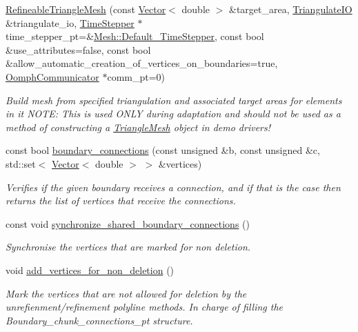 \begin{DoxyCompactItemize}
\item 
\hyperlink{classoomph_1_1RefineableTriangleMesh_a488004263be96473c332468e13e80a83}{Refineable\+Triangle\+Mesh} (const \hyperlink{classoomph_1_1Vector}{Vector}$<$ double $>$ \&target\+\_\+area, \hyperlink{structoomph_1_1TriangulateIO}{Triangulate\+IO} \&triangulate\+\_\+io, \hyperlink{classoomph_1_1TimeStepper}{Time\+Stepper} $\ast$time\+\_\+stepper\+\_\+pt=\&\hyperlink{classoomph_1_1Mesh_a12243d0fee2b1fcee729ee5a4777ea10}{Mesh\+::\+Default\+\_\+\+Time\+Stepper}, const bool \&use\+\_\+attributes=false, const bool \&allow\+\_\+automatic\+\_\+creation\+\_\+of\+\_\+vertices\+\_\+on\+\_\+boundaries=true, \hyperlink{classoomph_1_1OomphCommunicator}{Oomph\+Communicator} $\ast$comm\+\_\+pt=0)
\begin{DoxyCompactList}\small\item\em Build mesh from specified triangulation and associated target areas for elements in it N\+O\+TE\+: This is used O\+N\+LY during adaptation and should not be used as a method of constructing a \hyperlink{classoomph_1_1TriangleMesh}{Triangle\+Mesh} object in demo drivers! \end{DoxyCompactList}\item 
const bool \hyperlink{classoomph_1_1RefineableTriangleMesh_a44ebcc99018e3d6795eca66ea20628b0}{boundary\+\_\+connections} (const unsigned \&b, const unsigned \&c, std\+::set$<$ \hyperlink{classoomph_1_1Vector}{Vector}$<$ double $>$ $>$ \&vertices)
\begin{DoxyCompactList}\small\item\em Verifies if the given boundary receives a connection, and if that is the case then returns the list of vertices that receive the connections. \end{DoxyCompactList}\item 
const void \hyperlink{classoomph_1_1RefineableTriangleMesh_ad9966aa29b0174bdddf6b1584a03f59f}{synchronize\+\_\+shared\+\_\+boundary\+\_\+connections} ()
\begin{DoxyCompactList}\small\item\em Synchronise the vertices that are marked for non deletion. \end{DoxyCompactList}\item 
void \hyperlink{classoomph_1_1RefineableTriangleMesh_ae876bda052e22ece09c21ff531aac8d2}{add\+\_\+vertices\+\_\+for\+\_\+non\+\_\+deletion} ()
\begin{DoxyCompactList}\small\item\em Mark the vertices that are not allowed for deletion by the unrefienment/refinement polyline methods. In charge of filling the Boundary\+\_\+chunk\+\_\+connections\+\_\+pt structure. \end{DoxyCompactList}\item 

\end{DoxyCompactItemize}
